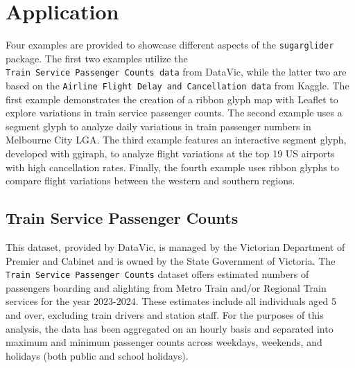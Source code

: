 \section{Application}\label{application}

Four examples are provided to showcase different aspects of the \texttt{sugarglider} package. The first two examples utilize the \texttt{Train\ Service\ Passenger\ Counts\ data} from DataVic, while the latter two are based on the \texttt{Airline\ Flight\ Delay\ and\ Cancellation\ data} from Kaggle. The first example demonstrates the creation of a ribbon glyph map with Leaflet to explore variations in train service passenger counts. The second example uses a segment glyph to analyze daily variations in train passenger numbers in Melbourne City LGA. The third example features an interactive segment glyph, developed with ggiraph, to analyze flight variations at the top 19 US airports with high cancellation rates. Finally, the fourth example uses ribbon glyphs to compare flight variations between the western and southern regions.

\subsection{Train Service Passenger Counts}\label{train-service-passenger-counts}

This dataset, provided by DataVic, is managed by the Victorian Department of Premier and Cabinet and is owned by the State Government of Victoria. The \texttt{Train\ Service\ Passenger\ Counts} dataset offers estimated numbers of passengers boarding and alighting from Metro Train and/or Regional Train services for the year 2023-2024. These estimates include all individuals aged 5 and over, excluding train drivers and station staff. For the purposes of this analysis, the data has been aggregated on an hourly basis and separated into maximum and minimum passenger counts across weekdays, weekends, and holidays (both public and school holidays).

